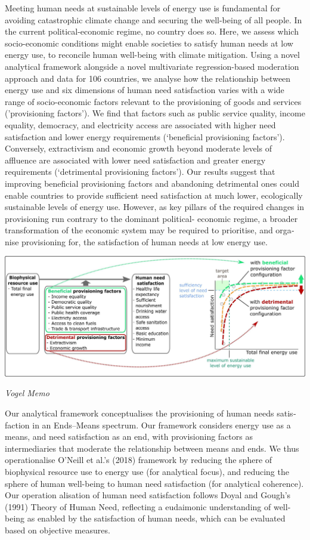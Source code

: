 \documentclass[
]{book}
\begin{document}
Meeting human needs at sustainable levels of energy use is fundamental for avoiding catastrophic climate change
and securing the well-being of all people. In the current political-economic regime, no country does so. Here, we
assess which socio-economic conditions might enable societies to satisfy human needs at low energy use, to
reconcile human well-being with climate mitigation.
Using a novel analytical framework alongside a novel multivariate regression-based moderation approach and
data for 106 countries, we analyse how the relationship between energy use and six dimensions of human need
satisfaction varies with a wide range of socio-economic factors relevant to the provisioning of goods and services
('provisioning factors'). We find that factors such as public service quality, income equality, democracy, and
electricity access are associated with higher need satisfaction and lower energy requirements (`beneficial
provisioning factors'). Conversely, extractivism and economic growth beyond moderate levels of affluence are
associated with lower need satisfaction and greater energy requirements (`detrimental provisioning factors'). Our
results suggest that improving beneficial provisioning factors and abandoning detrimental ones could enable
countries to provide sufficient need satisfaction at much lower, ecologically sustainable levels of energy use.
However, as key pillars of the required changes in provisioning run contrary to the dominant political-
economic regime, a broader transformation of the economic system may be required to prioritise, and orga­
nise provisioning for, the satisfaction of human needs at low energy use.

\includegraphics{fig/Vogel_framework.jpg}

\emph{Vogel Memo}

Our analytical framework conceptualises the provisioning of human needs satis­
faction in an Ends--Means spectrum. Our framework
considers energy use as a means, and need satisfaction as an end, with
provisioning factors as intermediaries that moderate the relationship
between means and ends. We thus operationalise O'Neill et al.'s (2018)
framework by reducing the sphere of biophysical resource use to energy
use (for analytical focus), and reducing the sphere of human well-being
to human need satisfaction (for analytical coherence). Our operation­
alisation of human need satisfaction follows Doyal and Gough's (1991)
Theory of Human Need, reflecting a eudaimonic understanding of well-
being as enabled by the satisfaction of human needs, which can be
evaluated based on objective measures.
\end{document}
